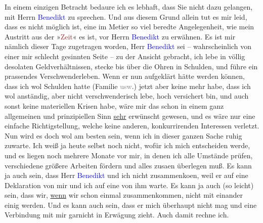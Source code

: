 \pstart
           In einem einzigen Betracht bedaure ich es lebhaft, dass Sie nicht dazu gelangen, mit
               Herrn \textcolor{blue}{Benedikt}{}\ledrightnote{\textcolor{blue}{Moriz Benedikt}} zu sprechen. Und aus diesem
               Grund allein tut es mir leid, dass es nicht möglich ist, eine im Metier so viel
               beredte Angelegenheit, wie mein Austritt aus der »\textcolor{brown}{Zeit}{}\ledrightnote{\textcolor{brown}{Die Zeit}}« es ist, vor Herrn \textcolor{blue}{Benedikt}{}\ledrightnote{\textcolor{blue}{Moriz Benedikt}} zu
               erwähnen. Es ist mir nämlich dieser Tage zugetragen worden, Herr \textcolor{blue}{Benedikt}{}\ledrightnote{\textcolor{blue}{Moriz Benedikt}} sei – wahrscheinlich von einer mir schlecht
               gesinnten Seite – zu der Ansicht gebracht, ich lebe in völlig desolaten
               Geldverhältnissen, stecke bis über die Ohren in Schulden, und führe ein prassendes
               Verschwenderleben. Wenn er nun aufgeklärt hätte werden können, dass ich wol Schulden
               hatte (Familie \textcolor{gray}{usw}.) jetzt aber keine mehr habe, dass ich wol
               anständig, aber nicht verschwenderisch lebe, hoch versichert bin, und auch sonst
               keine materiellen Krisen habe, wäre mir das schon in einem ganz allgemeinen und
               prinzipiellen Sinn \uline{sehr} erwünscht gewesen, und es
               wäre nur eine einfache Richtigstellung, welche keine anderen, konkurrirenden
               Interessen verletzt. Nun wird es doch wol am besten sein, wenn ich in dieser ganzen
               Sache ruhig zuwarte. Ich weiß ja heute selbst {\pb}noch nicht, wofür ich mich
               entscheiden werde, und es liegen noch mehrere Monate vor mir, in denen ich alle
               Umstände prüfen, verschiedene größere Arbeiten fördern und alles zusa{\geminationm}en überlegen muß. Es kann ja auch sein, dass Herr \textcolor{blue}{Benedikt}{}\ledrightnote{\textcolor{blue}{Moriz Benedikt}} und ich nicht zusammenko{\geminationm}en, weil er auf eine Deklaration von mir und ich auf
               eine von ihm warte. Es kann ja auch (so leicht) sein, dass wir, \uline{wenn} wir schon einmal zusammenkommen, nicht mit einander einig werden.
               Und es kann auch sein, dass er mich überhaupt nicht mag und eine Verbindung mit mir
               garnicht in Erwägung zieht. Auch damit rechne ich.\pend
           
